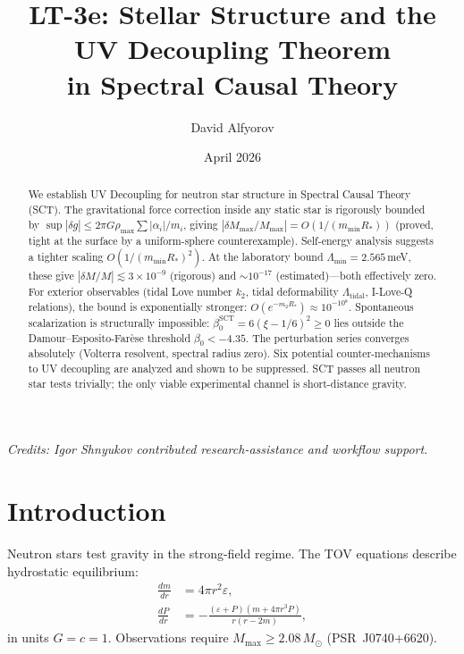 \documentclass[12pt,a4paper]{article}
\title{\textbf{LT-3e: Stellar Structure and the UV Decoupling Theorem\\[4pt]
in Spectral Causal Theory}}
\author{David Alfyorov}
\date{April 2026}
\newcommand{\Msun}{M_\odot}
\newcommand{\Mmax}{M_{\mathrm{max}}}
\newcommand{\Rstar}{R_*}
\begin{document}
\maketitle
\begin{center}
\small\textit{Credits: Igor Shnyukov contributed research-assistance and workflow support.}
\end{center}

\begin{abstract}
We establish UV Decoupling for neutron star structure in
Spectral Causal Theory (SCT).  The gravitational force correction
inside any static star is rigorously bounded by
$\sup|\delta g| \leq 2\pi G\rho_{\max}\sum|\alpha_i|/m_i$,
giving $|\delta\Mmax/\Mmax| = O(1/(m_{\min}\Rstar))$
(proved, tight at the surface by a uniform-sphere counterexample).
Self-energy analysis suggests a tighter scaling $O(1/(m_{\min}\Rstar)^2)$.
At the laboratory bound $\Lambda_{\min} = 2.565$\,meV, these give
$|\delta M/M| \lesssim 3 \times 10^{-9}$ (rigorous) and
$\sim 10^{-17}$ (estimated)---both effectively zero.
For exterior observables (tidal Love number $k_2$, tidal deformability
$\Lambda_{\mathrm{tidal}}$, I-Love-Q relations), the bound is
exponentially stronger: $O(e^{-m_2\Rstar}) \approx 10^{-10^8}$.
Spontaneous scalarization is structurally impossible:
$\beta_0^{\mathrm{SCT}} = 6(\xi-1/6)^2 \geq 0$ lies outside the
Damour--Esposito-Far\`ese threshold $\beta_0 < -4.35$.
The perturbation series converges absolutely (Volterra resolvent,
spectral radius zero).  Six potential counter-mechanisms to UV
decoupling are analyzed and shown to be suppressed.
SCT passes all neutron star tests trivially; the only viable
experimental channel is short-distance gravity.
\end{abstract}

\tableofcontents
\newpage

\section{Introduction}
\label{sec:intro}

Neutron stars test gravity in the strong-field regime.
The TOV equations describe hydrostatic equilibrium:
\begin{align}
  \frac{dm}{dr} &= 4\pi r^2 \varepsilon, \label{eq:tov-mass} \\
  \frac{dP}{dr} &= -\frac{(\varepsilon + P)(m + 4\pi r^3 P)}{r(r - 2m)},
  \label{eq:tov-pressure}
\end{align}
in units $G = c = 1$.  Observations require $\Mmax \geq 2.08\,\Msun$
(PSR~J0740+6620).
\end{document}
